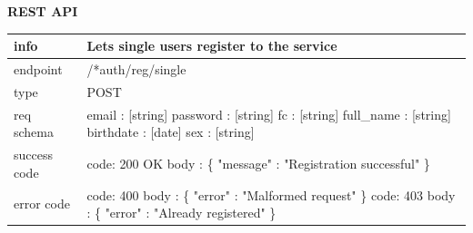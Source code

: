 \documentclass[titlepage]{article}
\begin{document}
\pagebreak

{\bf REST API}\\ 

\begin{tabularx}{\textwidth}{lX} \hline
    info & Lets single users register to the service \\ \hline
    endpoint & /*auth/reg/single \\ \hline
    type & POST \\ \hline
    req schema & 
        email : [string] \newline
        password : [string] \newline
        fc : [string] \newline
        full\_name : [string] \newline
        birthdate : [date] \newline
        sex : [string] \\ \hline
    success code &
        code: 200 OK \newline 
        body : \{ \newline
        "message" : "Registration successful" \newline
        \} \\ \hline
    error code &
        code: 400 \newline
        body : \{ "error" : "Malformed request" \} \newline \newline
        code: 403 \newline
        body : \{ "error" : "Already registered" \}  \\ \hline
\end{tabularx}

\vspace{\baselineskip}
\end{document}
